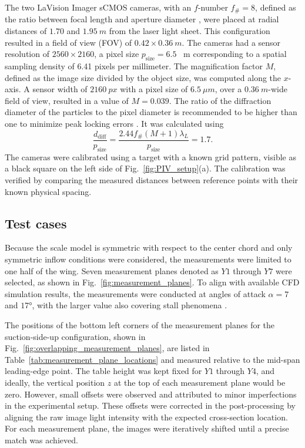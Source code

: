 \documentclass[wes, manuscript]{copernicus}
\begin{document}
The two LaVision Imager sCMOS cameras, with an $f$-number $f_{\#} = 8$, defined as the ratio between focal length and aperture diameter \citep{Raffel2018},
were placed at radial distances of $1.70$ and $1.95~\unit{m}$ from the laser light sheet. This configuration resulted in a field of view (FOV) of $0.42 \times 0.36~\unit{m}$. The cameras had a sensor resolution of $2560 \times 2160$, a pixel size $p_{\textrm{size}} = 6.5$ \unit{\mu m} corresponding to a spatial sampling density of 6.41 pixels per millimeter. The magnification factor $M$, defined as the image size divided by the object size, was computed along the $x$-axis.
A sensor width of $2160~\unit{px}$ with a pixel size of $6.5~\unit{\mu m}$, over a $0.36~\unit{m}$-wide field of view, resulted in a value of $M=0.039$. The ratio of the diffraction diameter of the particles to the pixel diameter is recommended to be higher than one to minimize peak locking errors \citep{Raffel2018,Bensason2025}. It was calculated using
\begin{equation}
    \frac{d_{\textrm{diff}}}{p_{\textrm{size}}} = \frac{2.44 f_{\#} (M + 1) \lambda_L}{p_{\textrm{size}}} = 1.7.
\end{equation}
The cameras were calibrated using a target with a known grid pattern, visible as a black square on the left side of Fig.~\ref{fig:PIV_setup}(a). The calibration was verified by comparing the measured distances between reference points with their known physical spacing.
%
\subsection{Test cases}
%
Because the scale model is symmetric with respect to the center chord and only symmetric inflow conditions were considered, the measurements were limited to one half of the wing. Seven measurement planes denoted as $Y1$ through $Y7$ were selected, as shown in Fig.~\ref{fig:measurement_planes}. To align with available CFD simulation results, the measurements were conducted at angles of attack $\alpha = 7$ and $17\unit{\degree}$, with the larger value also covering stall phenomena \citep{Poland2025b}.

The positions of the bottom left corners of the measurement planes for the suction-side-up configuration, shown in Fig.~\ref{fig:overlapping_measurement_planes}, are listed in Table~\ref{tab:measurement_plane_locations} and measured relative to the mid-span leading-edge point. The table height was kept fixed for $Y1$ through $Y4$, and ideally, the vertical position $z$ at the top of each measurement plane would be zero.  However, small offsets were observed and attributed to minor imperfections in the experimental setup. These offsets were corrected in the post-processing by aligning the raw image light intensity with the expected cross-section location. For each measurement plane, the images were iteratively shifted until a precise match was achieved.
\end{document}
